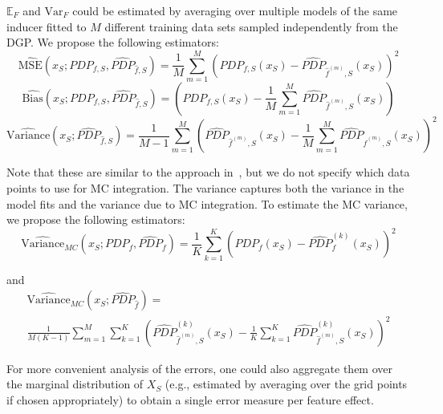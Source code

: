 \documentclass[runningheads]{llncs}
\begin{document}
\noindent $\mathbb{E}_F$ and $\text{Var}_F$ could be estimated by averaging over
multiple models of the same inducer fitted to $M$ different training data
sets sampled independently from the DGP. We propose the following estimators:  %
\begin{equation}
    \widehat{\text{MSE}}(x_S; PDP_{f,S}, \widehat{PDP}_{\hat f,S}) = \frac{1}{M} \sum_{m=1}^{M} {(PDP_{f,S}(x_S) - \widehat{PDP}_{\hat f^{(m)},S}(x_S))}^2
    \label{eq:mse-estimator}
\end{equation}
\begin{equation}
    \widehat{\text{Bias}}(x_S; PDP_{f,S}, \widehat{PDP}_{\hat f,S}) = (PDP_{f,S}(x_S) - \frac{1}{M}\sum_{m=1}^M \widehat{PDP}_{\hat{f}^{(m)},S}(x_S))
    \label{eq:bias-estimator}
\end{equation}
\begin{equation}
    \widehat{\text{Variance}}(x_S; \widehat{PDP}_{\hat f,S}) =
    \frac{1}{M-1}\sum_{m=1}^M{\left(\widehat{PDP}_{\hat f^{(m)},S}(x_S) - \frac{1}{M}\sum_{m=1}^M \widehat{PDP}_{\hat f^{(m)},S}(x_S)\right)}^2
    \label{eq:variance-estimator}
\end{equation}

\noindent Note that these are similar to the approach in~\cite{molnar_relating_2023},
but we do not specify which data points to use for MC integration. The
variance captures both the variance in the model fits and the variance due to
MC integration. To estimate the MC variance, we propose the following estimators:
\begin{equation}
    \widehat{\text{Variance}}_{MC}(x_S; PDP_f, \widehat{PDP}_f) = \frac{1}{K}\sum_{k=1}^K{(PDP_f(x_S) - \widehat{PDP}_f^{(k)}(x_S))}^2
    \label{eq:mc-variance-estimator-groundtruth}
\end{equation}

\noindent and
\begin{equation}
    \begin{split}
        \widehat{\text{Variance}}_{MC}(x_S; \widehat{PDP}_{\hat{f}}) = \\ \frac{1}{M(K-1)}\sum_{m=1}^M \sum_{k=1}^K
        {\left(\widehat{PDP}_{\hat f^{(m)},S}^{(k)}(x_S) - \frac{1}{K}\sum_{k=1}^K \widehat{PDP}_{\hat f^{(m)},S}^{(k)}(x_S)\right)}^2
    \end{split}
    \label{eq:mc-variance-estimator-model}
\end{equation}

\noindent For more convenient analysis of the errors, one could also
aggregate them over the marginal distribution of $X_S$ (e.g.,
estimated by averaging over the grid points if chosen appropriately)
to obtain a single error measure per feature effect.
\end{document}
